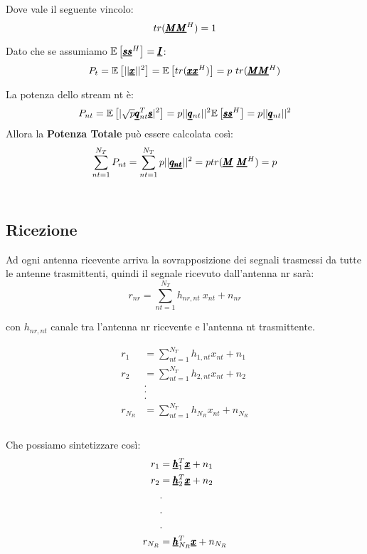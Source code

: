 Dove vale il seguente vincolo:
\begin{equation*}
    tr(\pmb{\underline{M}}\pmb{\underline{M}}^H) = 1
\end{equation*}

Dato che se assumiamo $\mathbb{E}\left[\pmb{\underline{s}}\pmb{\underline{s}}^H\right] = \pmb{\underline{I}}$:
\begin{equation*}
    P_t = \mathbb{E}\left[||\pmb{\underline{x}}||^2\right] = \mathbb{E}\left[tr(\pmb{\underline{x}}\pmb{\underline{x}}^H)\right] = p \ tr(\pmb{\underline{M}}\pmb{\underline{M}}^H)
\end{equation*}

La potenza dello stream nt è:
\begin{equation*}
    P_{nt} = \mathbb{E}\left[|\sqrt{p}\pmb{\underline{q}}_{nt}^T \pmb{\underline{s}}|^2\right] = p||\pmb{\underline{q}}_{nt}||^2 \mathbb{E}\left[\pmb{\underline{s}}\pmb{\underline{s}}^H\right] = p||\pmb{\underline{q}}_{nt}||^2
\end{equation*}
Allora la \textbf{Potenza Totale} può essere calcolata così:
\begin{equation*}
    \sum_{nt=1}^{N_T} P_{nt} = \sum_{nt=1}^{N_T} p||\pmb{\underline{q_{nt}}}||^2 = p tr(\pmb{\underline{M}}\ \pmb{\underline{M}}^H) = p
\end{equation*}
\\

\subsection{Ricezione}
Ad ogni antenna ricevente arriva la sovrapposizione dei segnali trasmessi da tutte le antenne trasmittenti, quindi il segnale ricevuto dall'antenna nr sarà:
\begin{equation*}
    r_{nr} = \sum_{nt=1}^{N_T} h_{nr,nt} \ x_{nt} + n_{nr}
\end{equation*}

con $h_{nr,nt}$ canale tra l'antenna nr ricevente e l'antenna nt trasmittente.

\begin{equation*}
    \begin{aligned}
    r_1 &=  \sum_{nt=1}^{N_T} h_{1,nt} x_{nt} + n_{1} \\
    r_2 &=  \sum_{nt=1}^{N_T} h_{2,nt} x_{nt} + n_{2} \\
    &.\\&.\\&.\\
    r_{N_R} &=  \sum_{nt=1}^{N_T} h_{N_R} x_{nt} + n_{N_R} \\
    \end{aligned}
\end{equation*}
\\

Che possiamo sintetizzare così:
\begin{equation*}
    \begin{aligned}
     r_1 &=   \pmb{\underline{h}}^T_{1} \pmb{\underline{x}} + n_{1} \\
    r_2 &=  \pmb{\underline{h}}^T_{2} \pmb{\underline{x}} + n_{2} \\
    &.\\&.\\&.\\
    r_{N_R} &=  \pmb{\underline{h}}^T_{N_R} \pmb{\underline{x}} + n_{N_R} \\
    \end{aligned}
\end{equation*}
\\

